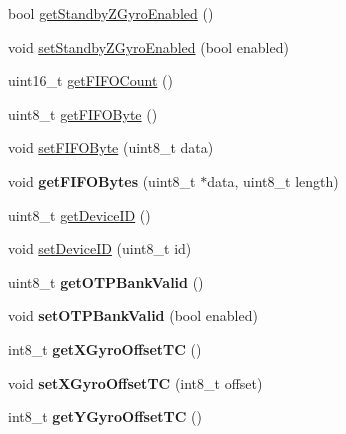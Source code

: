 \begin{DoxyCompactItemize}
bool \mbox{\hyperlink{class_m_p_u6050_a20f7804db1a980a3c425ae44c33d420b}{get\+Standby\+Z\+Gyro\+Enabled}} ()
\item 
void \mbox{\hyperlink{class_m_p_u6050_ada7c8a873fe157703dcdc08e25b48e32}{set\+Standby\+Z\+Gyro\+Enabled}} (bool enabled)
\item 
uint16\+\_\+t \mbox{\hyperlink{class_m_p_u6050_ad96c7a75a39327ebaae01386bcbc58dd}{get\+F\+I\+F\+O\+Count}} ()
\item 
uint8\+\_\+t \mbox{\hyperlink{class_m_p_u6050_a7733011d30d5b64564f6b5422d8639ae}{get\+F\+I\+F\+O\+Byte}} ()
\item 
void \mbox{\hyperlink{class_m_p_u6050_a66da5bc38aa82404117d1ef5306c951a}{set\+F\+I\+F\+O\+Byte}} (uint8\+\_\+t data)
\item 
\mbox{\label{class_m_p_u6050_aba36dcb767b5cd8965053987aaa08a6a}} 
void {\bfseries get\+F\+I\+F\+O\+Bytes} (uint8\+\_\+t $\ast$data, uint8\+\_\+t length)
\item 
uint8\+\_\+t \mbox{\hyperlink{class_m_p_u6050_a35ae3c8894b3258e642043886801e031}{get\+Device\+ID}} ()
\item 
void \mbox{\hyperlink{class_m_p_u6050_aaefb4b3d93cf4b78d56cd63b10ea0e97}{set\+Device\+ID}} (uint8\+\_\+t id)
\item 
\mbox{\label{class_m_p_u6050_a6eb099e3dc96eb4d113cf81804256e8c}} 
uint8\+\_\+t {\bfseries get\+O\+T\+P\+Bank\+Valid} ()
\item 
\mbox{\label{class_m_p_u6050_a074024a7818b2998b3f1c99064bea3a0}} 
void {\bfseries set\+O\+T\+P\+Bank\+Valid} (bool enabled)
\item 
\mbox{\label{class_m_p_u6050_afb6b0de954cc89e161e5ac389102af0c}} 
int8\+\_\+t {\bfseries get\+X\+Gyro\+Offset\+TC} ()
\item 
\mbox{\label{class_m_p_u6050_a571bb0b54080a1def63fb4166b7f7f59}} 
void {\bfseries set\+X\+Gyro\+Offset\+TC} (int8\+\_\+t offset)
\item 
\mbox{\label{class_m_p_u6050_aeec244d6f9d33f45260ff459fabb9622}} 
int8\+\_\+t {\bfseries get\+Y\+Gyro\+Offset\+TC} ()
\item 
\mbox{\label{class_m_p_u6050_a5a671929be9a7d6ff5e433aa0eaa0c90}} 

\end{DoxyCompactItemize}

